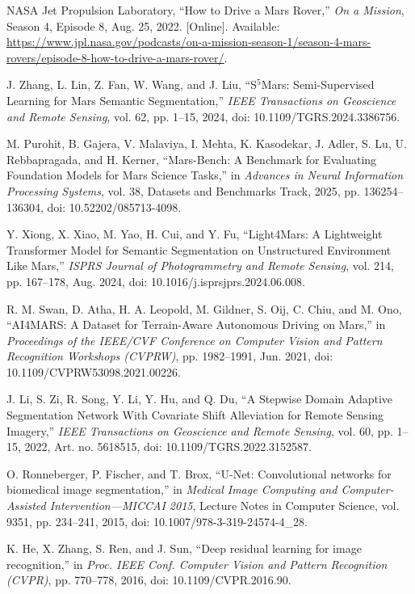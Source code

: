 NASA Jet Propulsion Laboratory, ``How to Drive a Mars Rover,'' \emph{On a Mission}, Season 4, Episode 8, Aug. 25, 2022. [Online]. Available: \url{https://www.jpl.nasa.gov/podcasts/on-a-mission-season-1/season-4-mars-rovers/episode-8-how-to-drive-a-mars-rover/}.

J. Zhang, L. Lin, Z. Fan, W. Wang, and J. Liu, ``S\(^{5}\)Mars: Semi-Supervised Learning for Mars Semantic Segmentation,'' \emph{IEEE Transactions on Geoscience and Remote Sensing}, vol. 62, pp. 1--15, 2024, doi: 10.1109/TGRS.2024.3386756.

M. Purohit, B. Gajera, V. Malaviya, I. Mehta, K. Kasodekar, J. Adler, S. Lu, U. Rebbapragada, and H. Kerner, ``Mars-Bench: A Benchmark for Evaluating Foundation Models for Mars Science Tasks,'' in \emph{Advances in Neural Information Processing Systems}, vol. 38, Datasets and Benchmarks Track, 2025, pp. 136254--136304, doi: 10.52202/085713-4098.

Y. Xiong, X. Xiao, M. Yao, H. Cui, and Y. Fu, ``Light4Mars: A Lightweight Transformer Model for Semantic Segmentation on Unstructured Environment Like Mars,'' \emph{ISPRS Journal of Photogrammetry and Remote Sensing}, vol. 214, pp. 167--178, Aug. 2024, doi: 10.1016/j.isprsjprs.2024.06.008.

R. M. Swan, D. Atha, H. A. Leopold, M. Gildner, S. Oij,
C. Chiu, and M. Ono,
``AI4MARS: A Dataset for Terrain-Aware Autonomous Driving on Mars,''
in \emph{Proceedings of the IEEE/CVF Conference on Computer Vision
    and Pattern Recognition Workshops (CVPRW)},
pp. 1982--1991, Jun. 2021,
doi: 10.1109/CVPRW53098.2021.00226.

J. Li, S. Zi, R. Song, Y. Li, Y. Hu, and Q. Du,
``A Stepwise Domain Adaptive Segmentation Network With Covariate
Shift Alleviation for Remote Sensing Imagery,''
\emph{IEEE Transactions on Geoscience and Remote Sensing},
vol. 60, pp. 1--15, 2022, Art. no. 5618515,
doi: 10.1109/TGRS.2022.3152587.

O. Ronneberger, P. Fischer, and T. Brox,
``U-Net: Convolutional networks for biomedical image segmentation,''
in \emph{Medical Image Computing and Computer-Assisted Intervention---MICCAI 2015},
Lecture Notes in Computer Science, vol. 9351, pp. 234--241, 2015,
doi: 10.1007/978-3-319-24574-4\_28.

K. He, X. Zhang, S. Ren, and J. Sun,
``Deep residual learning for image recognition,''
in \emph{Proc. IEEE Conf. Computer Vision and Pattern Recognition (CVPR)},
pp. 770--778, 2016,
doi: 10.1109/CVPR.2016.90.

